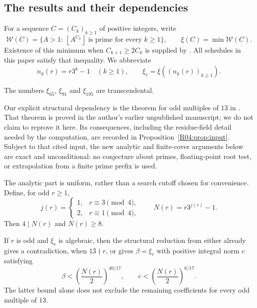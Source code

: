 \documentclass[11pt,a4paper]{article}
\theoremstyle{definition}\newtheorem{definition}[theorem]{Definition}
\theoremstyle{remark}\newtheorem{remark}[theorem]{Remark}
\newcommand{\floor}[1]{\left\lfloor#1\right\rfloor}
\begin{document}
\subsection{The results and their dependencies}

For a sequence $C=(C_k)_{k\ge1}$ of positive integers, write
\[
 \mathcal W(C)=\{A>1:\ \floor{A^{C_k}}\text{ is prime for every }k\ge1\},
 \qquad \xi(C)=\min\mathcal W(C).
\]
Existence of this minimum when $C_{k+1}\ge2C_k$ is supplied by
\cite[Theorem~1.3]{Saito}. All schedules in this paper satisfy that
inequality. We abbreviate
\begin{equation}\label{R04:eq:schedule}
 n_k(r)=r3^k-1\quad(k\ge1),\qquad
 \xi_r=\xi((n_k(r))_{k\ge1}).
\end{equation}

\begin{mainthm}\label{R04:thm:main}
The numbers $\xi_{65}$, $\xi_{91}$ and $\xi_{195}$ are transcendental.
\end{mainthm}

Our explicit structural dependency is the theorem for odd multiples of
$13$ in \cite[Section~7.2, Theorem~\textup{\texttt{D13}}]{K064}.
That theorem is proved in the author's earlier unpublished manuscript;
we do not claim to reprove it here. Its consequences, including the
residue-field detail needed by the computation, are recorded in
Proposition~\ref{R04:prop:input}. Subject to that cited input, the new
analytic and finite-cover arguments below are exact and unconditional:
no conjecture about primes, floating-point root test, or extrapolation
from a finite prime prefix is used.

The analytic part is uniform, rather than a search cutoff chosen for
convenience. Define, for odd $r\ge1$,
\begin{equation}\label{R04:eq:N}
 j(r)=\begin{cases}1,&r\equiv3\pmod4,\\2,&r\equiv1\pmod4,\end{cases}
 \qquad N(r)=r3^{j(r)}-1.
\end{equation}
Then $4\mid N(r)$ and $N(r)\ge8$.

\begin{mainthm}\label{R04:thm:boundmain}
If $r$ is odd and $\xi_r$ is algebraic, then the structural reduction
from \cite{K064} either already gives a contradiction, when $13\nmid r$,
or gives $\beta=\xi_r$ with positive integral norm $c$ satisfying
\[
 \beta<\left(\frac{N(r)}2\right)^{40/17},\qquad
 c<\left(\frac{N(r)}2\right)^{6/17}.
\]
The latter bound alone does not exclude the remaining coefficients
for every odd multiple of $13$.
\end{mainthm}
\end{document}
